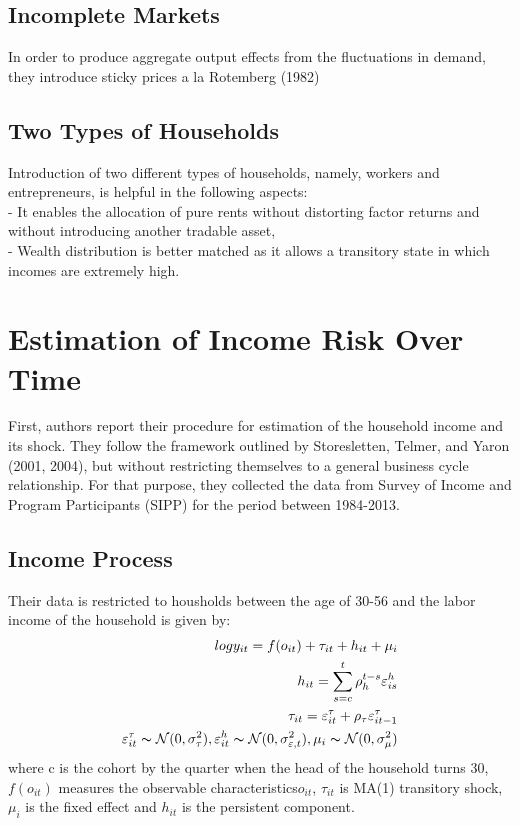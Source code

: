 \documentclass[titlepage]{\econtex}
\begin{document}
\hypertarget{Incomplete Markets}{}
\subsection{Incomplete Markets}

 In order to produce aggregate output effects from the fluctuations in demand, they introduce sticky prices a la Rotemberg (1982)

\hypertarget{Two Types of Households}{}
\subsection{Two Types of Households}

  Introduction of two different types of households, namely, workers and entrepreneurs, is helpful in the following aspects:\\
- It enables the allocation of pure rents without distorting factor returns and without introducing another tradable asset,\\
- Wealth distribution is better matched as it allows a transitory state in which incomes are extremely high.
 
\hypertarget{Estimation of Income Risk Over Time}{}
\section{Estimation of Income Risk Over Time}

First, authors report their procedure for estimation of the household income and its shock. They follow the framework outlined by Storesletten, Telmer, and Yaron (2001, 2004), but without restricting themselves to a general business cycle relationship. For that purpose, they collected  the data from Survey of Income and Program Participants (SIPP) for the period between 1984-2013.

\hypertarget{Income Process}{}
\subsection{Income Process}

Their data is restricted to housholds between the age of 30-56 and the labor income of the household is given by:\\
\begin{align}
logy_{it} = f(o_{it}) + \tau_{it} + h_{it} + \mu_{i}\\
     h_{it} = \sum_{s=c}^{t}\rho_{h}^{t-s}\varepsilon_{is}^{h}\\
    \tau_{it} = \varepsilon_{it}^{\tau} + \rho_{\tau}\varepsilon_{it-1}^{\tau} \\
     \varepsilon_{it}^{\tau} \thicksim \mathcal{N}(0,\sigma_{\tau}^{2}),   \varepsilon_{it}^{h} \thicksim \mathcal{N}(0,\sigma_{\varepsilon,t}^{2}),   \mu_{i}\thicksim \mathcal{N}(0,\sigma_{\mu}^{2})
\end{align}
where c is the cohort by the quarter when the head of the household turns 30, $f(o_{it})$ measures  the observable characteristics$ o_{it}$, $ \tau_{it}$ is MA(1) transitory shock, $ \mu_{i}$ is the fixed effect and $h_{it}$ is the persistent component.
\end{document}
